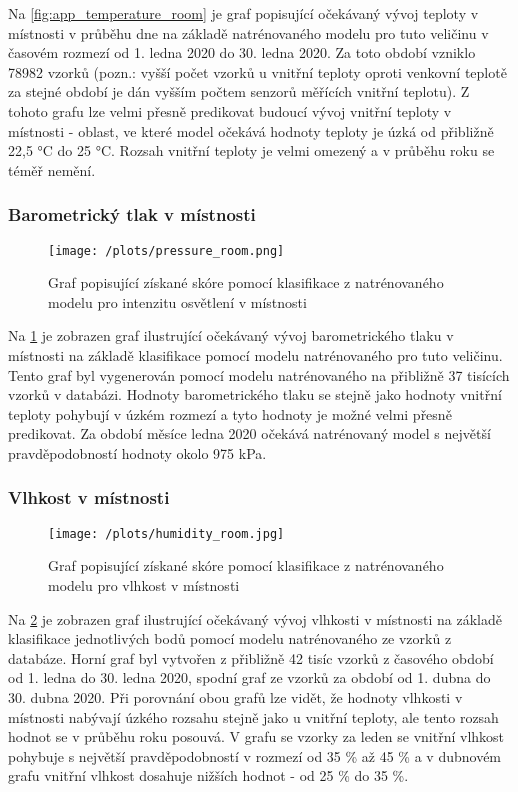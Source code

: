Na \cref{fig:app_temperature_room} je graf popisující očekávaný vývoj teploty v místnosti v průběhu dne na základě natrénovaného modelu pro tuto veličinu v časovém rozmezí od 1. ledna 2020 do 30. ledna 2020. Za toto období vzniklo 78982 vzorků (pozn.: vyšší počet vzorků u vnitřní teploty oproti venkovní teplotě za stejné období je dán vyšším počtem senzorů měřících vnitřní teplotu). Z tohoto grafu lze velmi přesně predikovat budoucí vývoj vnitřní teploty v místnosti - oblast, ve které model očekává hodnoty teploty je úzká od přibližně 22,5 \si{\degree}C do 25 \si{\degree}C. Rozsah vnitřní teploty je velmi omezený a v průběhu roku se téměř nemění. 

\subsubsection*{Barometrický tlak v místnosti}

\begin{figure}[H]
  \centering
  \texttt{[image: /plots/pressure\_room.png]}
  \caption{Graf popisující získané skóre pomocí klasifikace z natrénovaného modelu pro intenzitu osvětlení v místnosti}
  \label{fig:app_pressure_room}
\end{figure}

Na \cref{fig:app_pressure_room} je zobrazen graf ilustrující očekávaný vývoj barometrického tlaku v místnosti na základě klasifikace pomocí modelu natrénovaného pro tuto veličinu. Tento graf byl vygenerován pomocí modelu natrénovaného na přibližně 37 tisících vzorků v databázi. Hodnoty barometrického tlaku se stejně jako hodnoty vnitřní teploty pohybují v úzkém rozmezí a tyto hodnoty je možné velmi přesně predikovat. Za období měsíce ledna 2020 očekává natrénovaný model s největší pravděpodobností hodnoty okolo 975 kPa.

\subsubsection*{Vlhkost v místnosti}

\begin{figure}[H]
  \centering
  \texttt{[image: /plots/humidity\_room.jpg]}
  \caption{Graf popisující získané skóre pomocí klasifikace z natrénovaného modelu pro vlhkost v místnosti}
  \label{fig:app_humidity_room}
\end{figure}

Na \cref{fig:app_humidity_room} je zobrazen graf ilustrující očekávaný vývoj vlhkosti v místnosti na základě klasifikace jednotlivých bodů pomocí modelu natrénovaného ze vzorků z databáze. Horní graf byl vytvořen z přibližně 42 tisíc vzorků z časového období od 1. ledna do 30. ledna 2020, spodní graf ze vzorků za období od 1. dubna do 30. dubna 2020. Při porovnání obou grafů lze vidět, že hodnoty vlhkosti v místnosti nabývají úzkého rozsahu stejně jako u vnitřní teploty, ale tento rozsah hodnot se v průběhu roku posouvá. V grafu se vzorky za leden se vnitřní vlhkost pohybuje s největší pravděpodobností v rozmezí od 35 \% až 45 \% a v dubnovém grafu vnitřní vlhkost dosahuje nižších hodnot - od 25 \% do 35 \%. 


